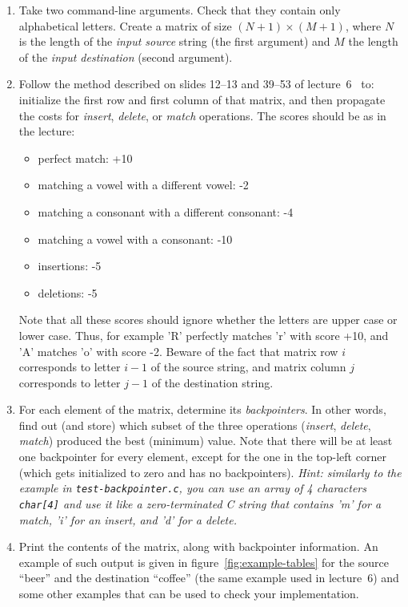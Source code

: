 \documentclass[a4paper,10pt]{article}
\begin{document}
\begin{enumerate}
\item
  Take two command-line arguments.
  Check that they contain only alphabetical letters.
  Create a matrix of size $(N+1)\times(M+1)$, where $N$ is the length of the \emph{input source} string (the first argument) and $M$ the length of the \emph{input destination} (second argument).
\item
  Follow the method described on slides 12--13 and 39--53 of lecture~6~\cite{lecture6} to: initialize the first row and first column of that matrix, and then propagate the costs for \emph{insert}, \emph{delete}, or \emph{match} operations.
  The scores should be as in the lecture:
  \begin{itemize}
  \item
    perfect match: +10
  \item
    matching a vowel with a different vowel: -2
  \item
    matching a consonant with a different consonant: -4
  \item
    matching a vowel with a consonant: -10
  \item
    insertions: -5
  \item
    deletions: -5
  \end{itemize}
  Note that all these scores should ignore whether the letters are upper case or lower case.
  Thus, for example 'R' perfectly matches 'r' with score +10, and 'A' matches 'o' with score -2.
  Beware of the fact that matrix row $i$ corresponds to letter $i-1$ of the source string, and matrix column $j$ corresponds to letter $j-1$ of the destination string.
\item
  For each element of the matrix, determine its \emph{backpointers}.
  In other words, find out (and store) which subset of the three operations (\emph{insert}, \emph{delete}, \emph{match}) produced the best (minimum) value.
  Note that there will be at least one backpointer for every element, except for the one in the top-left corner (which gets initialized to zero and has no backpointers).
  \emph{Hint: similarly to the example in \texttt{test-backpointer.c}, you can use an array of 4 characters \texttt{char[4]} and use it like a zero-terminated C string that contains 'm' for a match, 'i' for an insert, and 'd' for a delete.}
\item
  Print the contents of the matrix, along with backpointer information.
  An example of such output is given in figure~\ref{fig:example-tables} for the source ``beer'' and the destination ``coffee'' (the same example used in lecture~6) and some other examples that can be used to check your implementation.
\end{enumerate}
\end{document}
